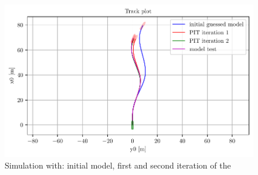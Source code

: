 \begin{figure}[H]
    \centering
    \includegraphics[width=\textwidth]{kappa/images/0.pdf}
    \caption{Simulation with: initial model, first and second iteration of the }
    \label{\detokenize{01.01_method:iterations}}
\end{figure}

